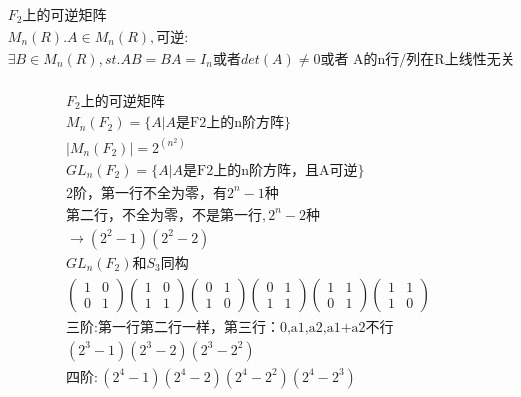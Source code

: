\documentclass[12pt, a4paper]{article}  %
\begin{document}
\begin{align}
    &F_2\text{上的可逆矩阵}\\
    &M_n(R).A\in M_n(R),\text{可逆:}\\
    &\exists B\in M_n(R),st.AB =BA=I_n\text{或者} det(A)\neq 0\text{或者 A的n行/列在R上线性无关}\\
\end{align}

\begin{align}
    &F_2\text{上的可逆矩阵}\\
    &M_n(F_2)=\{A|A\text{是F2上的n阶方阵}\}\\
    &|M_n(F_2)|=2^{(n^2)}\\
    &GL_n(F_2)=\{A|A\text{是F2上的n阶方阵，且A可逆}\}\\
    &\text{2阶，第一行不全为零，有}2^n-1\text{种}\\
    &\text{第二行，不全为零，不是第一行},2^n-2\text{种}\\
    &\rightarrow(2^2-1)(2^2-2)\\
    &GL_n(F_2)\text{和}S_3\text{同构}\\
    &\begin{pmatrix}
        1&0\\
        0&1
    \end{pmatrix}
    \begin{pmatrix}
        1&0\\
        1&1
    \end{pmatrix}
    \begin{pmatrix}
        0&1\\
        1&0
    \end{pmatrix}
    \begin{pmatrix}
        0&1\\
        1&1
    \end{pmatrix}
    \begin{pmatrix}
        1&1\\
        0&1
    \end{pmatrix}
    \begin{pmatrix}
        1&1\\
        1&0
    \end{pmatrix}\\
    &\text{三阶}:\text{第一行第二行一样，第三行：0,a1,a2,a1+a2不行}\\
    &(2^3-1)(2^3-2)(2^3-2^2)\\
    &\text{四阶}:(2^4-1)(2^4-2)(2^4-2^2)(2^4-2^3)
\end{align}
\end{document}
